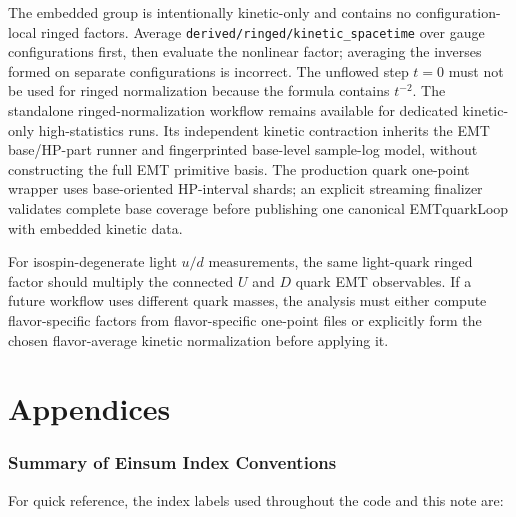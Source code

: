 \documentclass[11pt,a4paper]{article}
\newcommand{\code}[1]{\texttt{#1}}
\begin{document}
The embedded group is intentionally kinetic-only and contains no
configuration-local ringed factors.  Average \code{derived/ringed/kinetic\_spacetime}
over gauge configurations first, then evaluate the nonlinear factor; averaging
the inverses formed on separate configurations is incorrect.  The unflowed
step \(t=0\) must not be used for ringed normalization because the formula
contains \(t^{-2}\).  The standalone ringed-normalization workflow remains
available for dedicated kinetic-only high-statistics runs.  Its independent
kinetic contraction inherits the EMT base/HP-part runner and fingerprinted
base-level sample-log model, without constructing the full EMT primitive basis.
The production quark one-point wrapper uses base-oriented HP-interval shards;
an explicit streaming finalizer validates complete base coverage before
publishing one canonical EMTquarkLoop with embedded kinetic data.

For isospin-degenerate light \(u/d\) measurements, the same light-quark ringed
factor should multiply the connected \(U\) and \(D\) quark EMT observables.  If a
future workflow uses different quark masses, the analysis must either compute
flavor-specific factors from flavor-specific one-point files or explicitly form
the chosen flavor-average kinetic normalization before applying it.

\part{Appendices}

\appendix

\section{Summary of Einsum Index Conventions}

For quick reference, the index labels used throughout the code and this note are:
\end{document}
